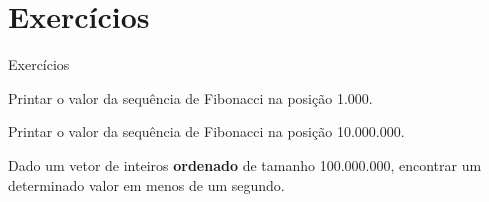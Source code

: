 \section{Exercícios}

\begin{slide}{Exercícios}

    \item Printar o valor da sequência de Fibonacci na posição 1.000.

    \item Printar o valor da sequência de Fibonacci na posição 10.000.000.

    \item Dado um vetor de inteiros \textbf{ordenado} de tamanho 100.000.000, encontrar um determinado valor em menos de um segundo.
\end{slide}
